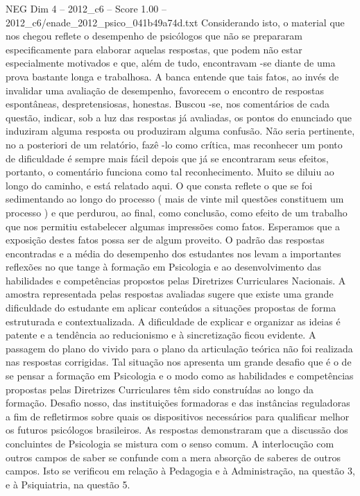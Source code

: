 \begin{textsample}{NEG Dim 4 – 2012\_c6 – Score 1.00 – 2012\_c6/enade\_2012\_psico\_041b49a74d.txt}
Considerando isto, o material que nos chegou reflete o desempenho de psicólogos que não se prepararam especificamente para elaborar aquelas respostas, que podem não estar especialmente motivados e que, além de tudo, encontravam -se diante de uma prova bastante longa e trabalhosa.
A banca entende que tais fatos, ao invés de invalidar uma avaliação de desempenho, favorecem o encontro de respostas espontâneas, despretensiosas, honestas.
Buscou -se, nos comentários de cada questão, indicar, sob a luz das respostas já avaliadas, os pontos do enunciado que induziram alguma resposta ou produziram alguma confusão.
Não seria pertinente, no a posteriori de um relatório, fazê -lo como crítica, mas reconhecer um ponto de dificuldade é sempre mais fácil depois que já se encontraram seus efeitos, portanto, o comentário funciona como tal reconhecimento.
Muito se diluiu ao longo do caminho, e está relatado aqui.
O que consta reflete o que se foi sedimentando ao longo do processo ( mais de vinte mil questões constituem um processo ) e que perdurou, ao final, como conclusão, como efeito de um trabalho que nos permitiu estabelecer algumas impressões como fatos.
Esperamos que a exposição destes fatos possa ser de algum proveito.
O padrão das respostas encontradas e a média do desempenho dos estudantes nos levam a importantes reflexões no que tange à formação em Psicologia e ao desenvolvimento das habilidades e competências propostos pelas Diretrizes Curriculares Nacionais.
A amostra representada pelas respostas avaliadas sugere que existe uma grande dificuldade do estudante em aplicar conteúdos a situações propostas de forma estruturada e contextualizada.
A dificuldade de explicar e organizar as ideias é patente e a tendência ao reducionismo e à sincretização ficou evidente.
A passagem do plano do vivido para o plano da articulação teórica não foi realizada nas respostas corrigidas.
Tal situação nos apresenta um grande desafio que é o de se pensar a formação em Psicologia e o modo como as habilidades e competências propostas pelas Diretrizes Curriculares têm sido construídas ao longo da formação.
Desafio nosso, das instituições formadoras e das instâncias reguladoras a fim de refletirmos sobre quais os dispositivos necessários para qualificar melhor os futuros psicólogos brasileiros.
As respostas demonstraram que a discussão dos concluintes de Psicologia se mistura com o senso comum.
A interlocução com outros campos de saber se confunde com a mera absorção de saberes de outros campos.
Isto se verificou em relação à Pedagogia e à Administração, na questão 3, e à Psiquiatria, na questão 5.

\end{textsample}
